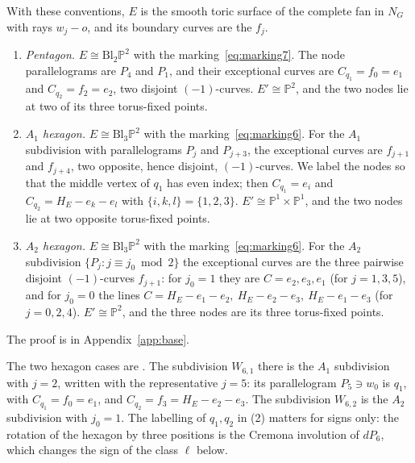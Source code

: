 \begin{proposition}\label{prop:classical}
With these conventions, $E$ is the smooth toric surface of the complete fan in $N_G$ with rays $w_j-o$, and its boundary
curves are the $f_j$.
\begin{enumerate}
\item \emph{Pentagon.} $E\cong\mathrm{Bl}_2\mathbb P^2$ with the marking~\eqref{eq:marking7}. The node parallelograms are
$P_4$ and $P_1$, and their exceptional curves are $C_{q_1}=f_0=e_1$ and $C_{q_2}=f_2=e_2$, two disjoint $(-1)$-curves.
$E'\cong\mathbb P^2$, and the two nodes lie at two of its three torus-fixed points.
\item \emph{$A_1$ hexagon.} $E\cong\mathrm{Bl}_3\mathbb P^2$ with the marking~\eqref{eq:marking6}. For the $A_1$ subdivision
with parallelograms $P_j$ and $P_{j+3}$, the exceptional curves are $f_{j+1}$ and $f_{j+4}$, two opposite, hence disjoint,
$(-1)$-curves. We label the nodes so that the middle vertex of $q_1$ has even index; then $C_{q_1}=e_i$ and
$C_{q_2}=H_E-e_k-e_l$ with $\{i,k,l\}=\{1,2,3\}$. $E'\cong\mathbb P^1\times\mathbb P^1$, and the two nodes lie at two
opposite torus-fixed points.
\item \emph{$A_2$ hexagon.} $E\cong\mathrm{Bl}_3\mathbb P^2$ with the marking~\eqref{eq:marking6}. For the $A_2$ subdivision
$\{P_j:j\equiv j_0\bmod2\}$ the exceptional curves are the three pairwise disjoint $(-1)$-curves $f_{j+1}$: for $j_0=1$
they are $C=e_2,e_3,e_1$ (for $j=1,3,5$), and for $j_0=0$ the lines $C=H_E-e_1-e_2,\ H_E-e_2-e_3,\ H_E-e_1-e_3$ (for $j=0,2,4$).
$E'\cong\mathbb P^2$, and the three nodes are its three torus-fixed points.
\end{enumerate}
\end{proposition}

The proof is in Appendix~\ref{app:base}.

The two hexagon cases are \cite[Prop.~3.7(2),(3)]{Paper5}. The subdivision $W_{6,1}$ there is the $A_1$ subdivision with $j=2$, written with the
representative $j=5$: its parallelogram $P_5\ni w_0$ is $q_1$, with $C_{q_1}=f_0=e_1$, and $C_{q_2}=f_3=H_E-e_2-e_3$. The subdivision
$W_{6,2}$ is the $A_2$ subdivision with $j_0=1$. The labelling of $q_1,q_2$ in (2) matters for signs only: the rotation of
the hexagon by three positions is the Cremona involution of $dP_6$, which changes the sign of the class $\ell$ below.

